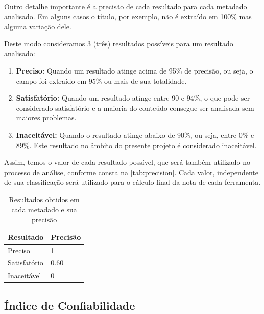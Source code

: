 
Outro detalhe importante é a precisão de cada resultado para cada metadado analisado. Em alguns casos o título, por exemplo, não é extraído em 100\% mas alguma variação dele. 

Deste modo consideramos 3 (três) resultados possíveis para um resultado analisado:

\begin{enumerate}
    \item \textbf{Preciso:} Quando um resultado atinge acima de 95\% de precisão, ou seja, o campo foi extraído em 95\% ou mais de sua totalidade.
    \item \textbf{Satisfatório:} Quando um resultado atinge entre 90 e 94\%, o que pode ser considerado satisfatório e a maioria do conteúdo consegue ser analisada sem maiores problemas.
    \item \textbf{Inaceitável:} Quando o resultado atinge abaixo de 90\%, ou seja, entre 0\% e 89\%. Este resultado no âmbito do presente projeto é considerado inaceitável.
\end{enumerate}

Assim, temos o valor de cada resultado possível, que será também utilizado no processo de análise, conforme consta na \autoref{tab:precision}. Cada valor, independente de sua classificação será utilizado para o cálculo final da nota de cada ferramenta.


\begin{table}
    \caption{Resultados obtidos em cada metadado e sua precisão}
    \begin{center}
    	\begin{tabular}{|C{3cm}|C{3cm}|}
			\hline \textbf{Resultado} & \textbf{Precisão} \\ 
			\hline Preciso & 1\\
	    	\hline Satisfatório & 0.60 \\
	    	\hline Inaceitável & 0 \\
	    	\hline 
    	\end{tabular} 
    \end{center}
  	\label{tab:precision}
\end{table}

\subsection{Índice de Confiabilidade}
\label{ssec:confiability-index}

